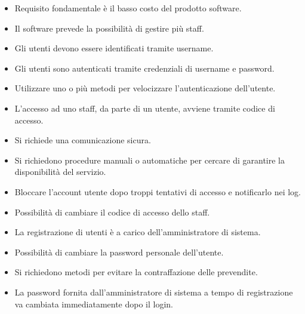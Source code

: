 \documentclass[a4paper]{article}
\begin{document}
\begin{itemize}
	
	

	\item Requisito fondamentale è il basso costo del prodotto software.
	
	\item Il software prevede la possibilità di gestire più staff.
	
	
	\item Gli utenti devono essere identificati tramite username.
	
	\item Gli utenti sono autenticati tramite credenziali di username e password.
	
	\item Utilizzare uno o più metodi per velocizzare l'autenticazione dell'utente.
	
	\item L'accesso ad uno staff, da parte di un utente, avviene tramite codice di accesso.	
		
	\item Si richiede una comunicazione sicura.
	
	\item Si richiedono procedure manuali o automatiche per cercare di garantire la disponibilità del servizio.
	
	\item Bloccare l'account utente dopo troppi tentativi di accesso e notificarlo nei log.
	
	\item Possibilità di cambiare il codice di accesso dello staff.
	\item La registrazione di utenti è a carico dell'amministratore di sistema.
	\item Possibilità di cambiare la password personale dell'utente.
	
	\item Si richiedono metodi per evitare la contraffazione delle prevendite.
	
	\item La password fornita dall'amministratore di sistema a tempo di registrazione va cambiata immediatamente dopo il login.
	

\end{itemize}
\end{document}
